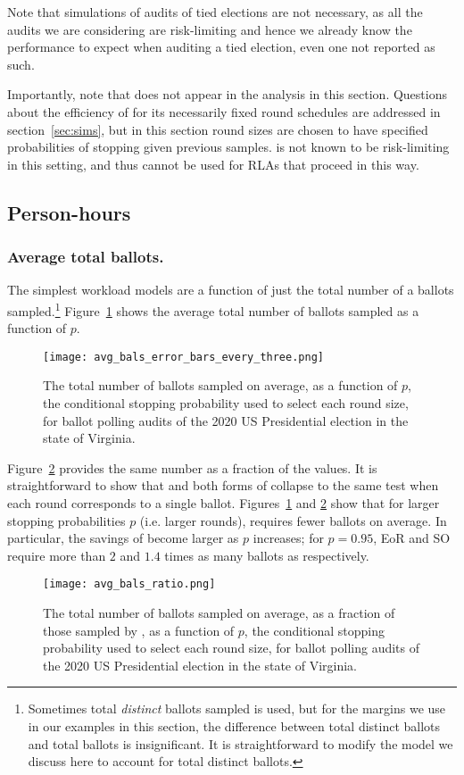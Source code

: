 Note that simulations of audits of tied elections are not necessary, as all the audits we are considering are risk-limiting and hence we already know the performance to expect when auditing a tied election, even one not reported as such. 

Importantly, note that \Minerva does not appear in the analysis in this section. 
Questions about the efficiency of \Minerva for its necessarily fixed round schedules are addressed in section~\ref{sec:sims}, but in this section round sizes are chosen to have specified probabilities of stopping given previous samples. \Minerva is not known to be risk-limiting in this setting, and thus cannot be used for RLAs that proceed in this way.

\subsection{Person-hours}

\subsubsection{Average total ballots.} 
The simplest workload models are a function of just the total number of a ballots sampled.\footnote{Sometimes total \emph{distinct} ballots sampled is used, but for the margins we use in our examples in this section, the difference between total distinct ballots and total ballots is insignificant\cite{arxiv_athena}. It is straightforward to modify the model we discuss here to account for total distinct ballots.} Figure~\ref{fig:avg_bals} shows the average total number of ballots sampled as a function of $p$.
\begin{figure}[h!]
\texttt{[image: avg\_bals\_error\_bars\_every\_three.png]}
\caption{The total number of ballots sampled on average, as a function of $p$, the conditional stopping probability used to select each round size, for ballot polling audits of the 2020 US Presidential election in the state of Virginia.}
\label{fig:avg_bals}
\end{figure}

Figure~\ref{fig:avg_bals_ratio} provides the same number as a fraction of the \Providence values.
It is straightforward to show that \Providence and both forms of \BRAVO collapse to the same test when each round corresponds to a single ballot. Figures~\ref{fig:avg_bals} and \ref{fig:avg_bals_ratio} show that for larger stopping probabilities $p$ (i.e. larger rounds), \Providence requires fewer ballots on average. In particular, the savings of \Providence become larger as $p$ increases; for $p=0.95$, EoR \BRAVO and SO \BRAVO require more than $2$ and $1.4$ times as many ballots as \Providence respectively. 
\begin{figure}[h!]
\texttt{[image: avg\_bals\_ratio.png]}
\caption{The total number of ballots sampled on average, as a fraction of those sampled by \Providence, as a function of $p$, the conditional stopping probability used to select each round size, for ballot polling audits of the 2020 US Presidential election in the state of Virginia.}
\label{fig:avg_bals_ratio}
\end{figure}


